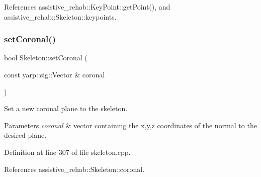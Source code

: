 References assistive\+\_\+rehab\+::\+Key\+Point\+::get\+Point(), and assistive\+\_\+rehab\+::\+Skeleton\+::keypoints.

\mbox{\label{classassistive__rehab_1_1Skeleton_ab3bd697f48ea69cfdc5ff7574c19041f}} 
\subsubsection{\texorpdfstring{setCoronal()}{setCoronal()}}
{\footnotesize\ttfamily bool Skeleton\+::set\+Coronal (\begin{DoxyParamCaption}\item[{const yarp\+::sig\+::\+Vector \&}]{coronal }\end{DoxyParamCaption})\hspace{0.3cm}{\ttfamily [inherited]}}



Set a new coronal plane to the skeleton. 


\begin{DoxyParams}{Parameters}
{\em coronal} & vector containing the x,y,z coordinates of the normal to the desired plane. \\
\hline
\end{DoxyParams}


Definition at line 307 of file skeleton.\+cpp.


\begin{DoxyCode}{0}

\end{DoxyCode}


References assistive\+\_\+rehab\+::\+Skeleton\+::coronal.

\mbox{\label{classassistive__rehab_1_1Skeleton_af92fdb0e3eb88a0b1dedd5038e2c6eb7}} 
